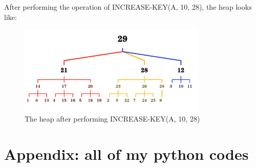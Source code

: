\documentclass{article}
\begin{document}
After performing the operation of INCREASE-KEY(A, 10, 28), the heap looks like:
\begin{figure}[H]
    \centering  %
    \includegraphics[width=0.8\textwidth]{result3}
    \caption{The heap after performing INCREASE-KEY(A, 10, 28)}
\end{figure}


\section*{Appendix: all of my python codes}
 
\end{document}
